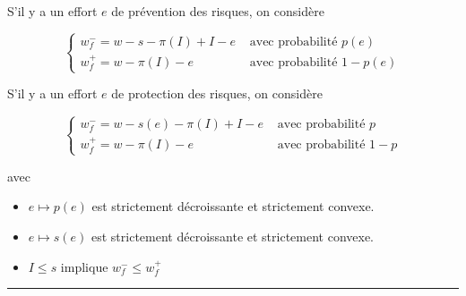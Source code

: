 \begin{f}
S'il y a un effort $e$ de prévention des risques, on considère

$$
\begin{cases}w_{f}^{-}=w-s-\pi(I)+I-e & \text { avec probabilité } p(e) \\ w_{f}^{+}=w-\pi(I)-e & \text { avec probabilité } 1-p(e)\end{cases}
$$

S'il y a un effort $e$ de protection des risques, on considère

$$
\begin{cases}w_{f}^{-}=w-s(e)-\pi(I)+I-e & \text { avec probabilité } p \\ w_{f}^{+}=w-\pi(I)-e & \text { avec probabilité } 1-p\end{cases}
$$

avec
\begin{itemize}
	\item $e \mapsto p(e)$ est strictement décroissante et strictement convexe.
	\item $e \mapsto s(e)$ est strictement décroissante et strictement convexe.\\
	\item $I \leq s$ implique $w_{f}^{-} \leq w_{f}^{+}$
\end{itemize}

\end{f}
\hrule


